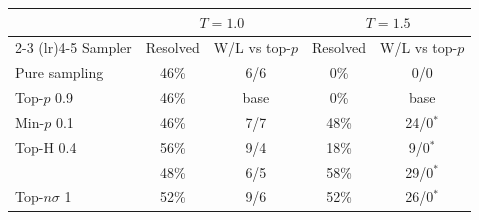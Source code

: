 \begin{tabular}{lcccc}
\toprule
 & \multicolumn{2}{c}{$T{=}1.0$} & \multicolumn{2}{c}{$T{=}1.5$} \\
\cmidrule(lr){2-3} \cmidrule(lr){4-5}
Sampler & Resolved & W/L vs top-$p$ & Resolved & W/L vs top-$p$ \\
\midrule
Pure sampling & 46\% & 6/6 & 0\% & 0/0 \\
Top-$p$ 0.9 & 46\% & base & 0\% & base \\
Min-$p$ 0.1 & 46\% & 7/7 & 48\% & 24/0$^{*}$ \\
Top-H 0.4 & 56\% & 9/4 & 18\% & 9/0$^{*}$ \\
\pless{} & 48\% & 6/5 & 58\% & 29/0$^{*}$ \\
Top-$n\sigma$ 1 & 52\% & 9/6 & 52\% & 26/0$^{*}$ \\
\bottomrule
\end{tabular}
